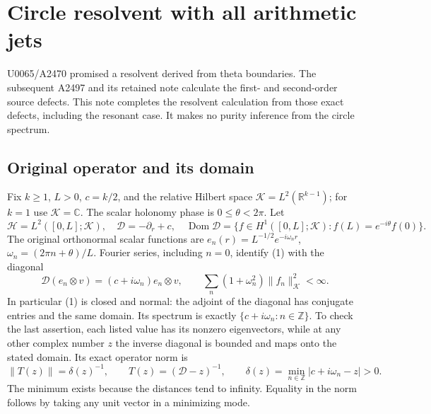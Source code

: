 \begingroup

\section{Circle resolvent with all arithmetic jets}
U0065/A2470 promised a resolvent derived from theta boundaries. The
subsequent A2497 and its retained note calculate the first- and
second-order source defects. This note completes the resolvent
calculation from those exact defects, including the resonant case.
It makes no purity inference from the circle spectrum.

\subsection{Original operator and its domain}
Fix \(k\ge1\), \(L>0\), \(c=k/2\), and the relative Hilbert space
\(\mathcal K=L^2(\mathbb R^{k-1})\); for \(k=1\) use
\(\mathcal K=\mathbb C\). The scalar holonomy phase is
\(0\le\theta<2\pi\). Let
\[
 \mathscr H=L^2([0,L];\mathcal K),\quad
 \mathscr D=-\partial_r+c,\quad
 \operatorname{Dom}\mathscr D=
 \{f\in H^1([0,L];\mathcal K):f(L)=e^{-i\theta}f(0)\}.
 \tag{1}
\]
The original orthonormal scalar functions are
\(e_n(r)=L^{-1/2}e^{-i\omega_nr}\),
\(\omega_n=(2\pi n+\theta)/L\). Fourier series, including
\(n=0\), identify (1) with the diagonal
\[
 \mathscr D(e_n\otimes v)=(c+i\omega_n)e_n\otimes v,
 \qquad
 \sum_n(1+\omega_n^2)\|f_n\|_{\mathcal K}^2<\infty.
 \tag{2}
\]
In particular (1) is closed and normal: the adjoint of the diagonal
has conjugate entries and the same domain. Its spectrum is exactly
\(\{c+i\omega_n:n\in\mathbb Z\}\). To check the last assertion,
each listed value has its nonzero eigenvectors, while at any other
complex number \(z\) the inverse diagonal is bounded and maps onto
the stated domain. Its exact operator norm is
\[
 \|T(z)\|=\delta(z)^{-1},\qquad
 T(z)=(\mathscr D-z)^{-1},\qquad
 \delta(z)=\min_{n\in\mathbb Z}|c+i\omega_n-z|>0.
 \tag{3}
\]
The minimum exists because the distances tend to infinity. Equality
in the norm follows by taking any unit vector in a minimizing mode.

